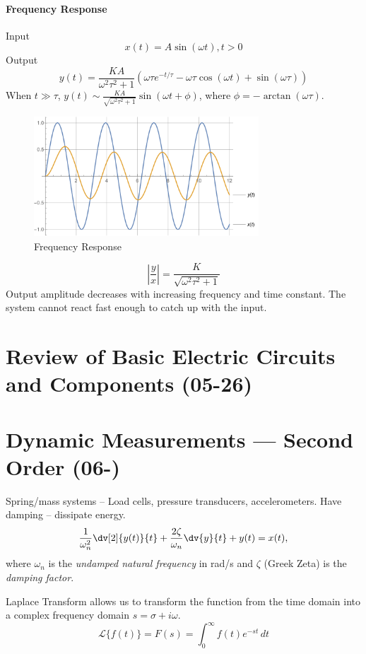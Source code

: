 \documentclass[a4paper,UTF8]{article}
\theoremstyle{mystyle}{
  \newtheorem{law}{Law}
}
\begin{document}
\paragraph{Frequency Response} 
Input 
\[
x(t)=A\sin(\omega t), t>0 
\]
Output
\[
y(t)=\frac{KA }{\omega ^2\tau ^2 +1}\left(  \omega\tau  e^{-{t/\tau }}-  \omega\tau  \cos ( \omega t)+\sin ( \omega\tau )\right)
\]
When $t \gg \tau$, $y(t)\sim \frac{KA}{\sqrt{\omega ^2\tau ^2 +1}}\sin(\omega t+\phi)$, where $\phi=-\arctan(\omega \tau)$.

\begin{figure}[htbp]
\centering
\caption{Frequency Response}
\includegraphics[width=0.75\textwidth]{fig/freq_res}
\end{figure}


\[
\left|\frac{y}{x}\right|=\frac{K}{\sqrt{\omega ^2\tau ^2 +1}}
\]
Output amplitude decreases with increasing
frequency and time constant.
The system cannot react fast enough to catch
up with the input.

\section{Review of Basic Electric Circuits and Components (05-26)}

\section{Dynamic Measurements --- Second Order (06-)}
Spring/mass systems – Load cells, pressure
transducers, accelerometers.
Have damping – dissipate energy.
\[
\frac{1}{\omega_n^2}\dv[2]{y(t)}{t}+\frac{2\zeta}{\omega_n}\dv{y}{t}+y(t)=x(t),
\]
where $\omega_n$ is the \emph{undamped natural frequency}
in rad/s and $\zeta$ (Greek Zeta) is the \emph{damping
factor}.

Laplace Transform allows us to transform the function from
the time domain into a complex frequency domain $s=\sigma+i\omega$.
\[
\mathcal{L}\{f(t)\}= F(s)=\int _{0}^{\infty }f(t)e^{-st}\,dt
\]
\end{document}
